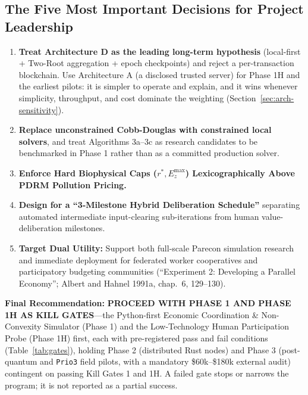 \documentclass[10pt,twoside,openany]{book}
\theoremstyle{dpepstyle}
\begin{document}
\subsection*{The Five Most Important Decisions for Project Leadership}
\begin{enumerate}[leftmargin=1.8em,itemsep=2pt]
  \item \textbf{Treat Architecture D as the leading long-term hypothesis} (local-first + Two-Root aggregation + epoch checkpoints) and reject a per-transaction blockchain. Use Architecture A (a disclosed trusted server) for Phase 1H and the earliest pilots: it is simpler to operate and explain, and it wins whenever simplicity, throughput, and cost dominate the weighting (Section~\ref{sec:arch-sensitivity}).
  \item \textbf{Replace unconstrained Cobb-Douglas with constrained local solvers}, and treat Algorithms 3a--3c as research candidates to be benchmarked in Phase 1 rather than as a committed production solver.
  \item \textbf{Enforce Hard Biophysical Caps ($r^*, E_z^{\max}$) Lexicographically Above PDRM Pollution Pricing.}
  \item \textbf{Design for a ``3-Milestone Hybrid Deliberation Schedule''} separating automated intermediate input-clearing sub-iterations from human value-deliberation milestones.
  \item \textbf{Target Dual Utility:} Support both full-scale Parecon simulation research and immediate deployment for federated worker cooperatives and participatory budgeting communities (``Experiment 2: Developing a Parallel Economy''; Albert and Hahnel 1991a, chap.~6, 129--130).
\end{enumerate}

\textbf{Final Recommendation:} \textbf{PROCEED WITH PHASE 1 AND PHASE 1H AS KILL GATES}---the Python-first Economic Coordination \& Non-Convexity Simulator (Phase 1) and the Low-Technology Human Participation Probe (Phase 1H) first, each with pre-registered pass and fail conditions (Table~\ref{tab:gates}), holding Phase 2 (distributed Rust nodes) and Phase 3 (post-quantum and \texttt{Prio3} field pilots, with a mandatory \$60k--\$180k external audit) contingent on passing Kill Gates 1 and 1H. A failed gate stops or narrows the program; it is not reported as a partial success.

\end{document}
